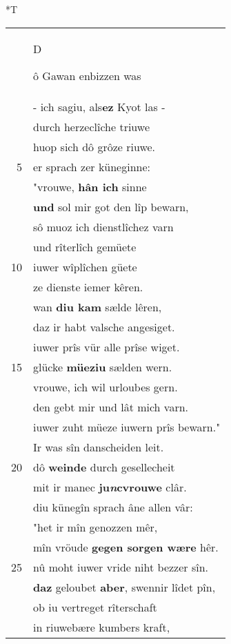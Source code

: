 \documentclass[8pt,a4paper,notitlepage]{article}
\begin{document}
\begin{table}[ht]
\begin{minipage}[t]{0.5\linewidth}
\end{minipage}
\hspace{0.5cm}
\begin{minipage}[t]{0.5\linewidth}
\small
\begin{center}*T
\end{center}
\begin{tabular}{rl}
 & \begin{large}D\end{large}ô Gawan enbizzen was\\ 
 & - ich sagiu, als\textbf{ez} Kyot las -\\ 
 & durch herzeclîche triuwe\\ 
 & huop sich dô grôze riuwe.\\ 
5 & er sprach zer küneginne:\\ 
 & "vrouwe, \textbf{hân ich} sinne\\ 
 & \textbf{und} sol mir got den lîp bewarn,\\ 
 & sô muoz ich dienstlîchez varn\\ 
 & und rîterlîch gemüete\\ 
10 & iuwer wîplîchen güete\\ 
 & ze dienste iemer kêren.\\ 
 & wan \textbf{diu kam} sælde lêren,\\ 
 & daz ir habt valsche angesiget.\\ 
 & iuwer prîs vür alle prîse wiget.\\ 
15 & glücke \textbf{müeziu} sælden wern.\\ 
 & vrouwe, ich wil urloubes gern.\\ 
 & den gebt mir und lât mich varn.\\ 
 & iuwer zuht müeze iuwern prîs bewarn."\\ 
 & Ir was sîn danscheiden leit.\\ 
20 & dô \textbf{weinde} durch gesellecheit\\ 
 & mit ir manec \textbf{ju\textit{n}cvrouwe} clâr.\\ 
 & diu künegîn sprach âne allen vâr:\\ 
 & "het ir mîn genozzen mêr,\\ 
 & mîn vröude \textbf{gegen sorgen wære} hêr.\\ 
25 & nû moht iuwer vride niht bezzer sîn.\\ 
 & \textbf{daz} geloubet \textbf{aber}, swennir lîdet pîn,\\ 
 & ob iu vertreget rîterschaft\\ 
 & in riuwebære kumbers kraft,\\ 

\end{tabular}
\end{minipage}
\end{table}
\end{document}
